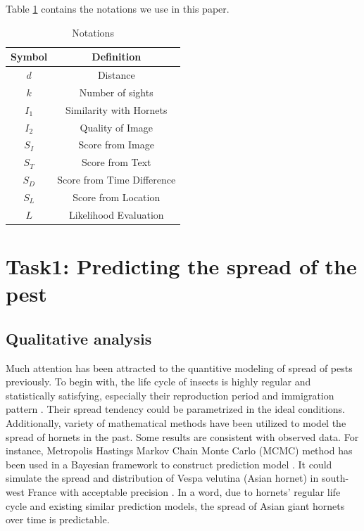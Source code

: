 \documentclass{mcmthesis}
\begin{document}
	Table \ref{tabbb1} contains the notations we use in this paper.

\linespread{1.2}		
		\begin{table}[H]
		\centering
		\caption{Notations \label{tabbb1}}
\begin{tabular}{c|c}
\hline
Symbol & Definition                 \\ \hline
$d$      & Distance                   \\
$k$      & Number of sights           \\
$I_1$     & Similarity with Hornets    \\
$I_2$     & Quality of Image           \\
$S_I$     & Score from Image           \\
$S_T$    & Score from Text            \\
$S_D$     & Score from Time Difference \\
$S_L$    & Score from Location        \\ 
$L$   & Likelihood Evaluation \\ \hline
\end{tabular}
\end{table}
\linespread{0.8}

\section{Task1: Predicting the spread of the pest}
	\subsection{Qualitative analysis}
	Much attention has been attracted to the quantitive modeling of spread of pests previously. To begin with, the life cycle of insects is highly regular and statistically satisfying, especially their reproduction period and immigration pattern \cite{reproduction}. Their spread tendency could be parametrized in the ideal conditions. Additionally, variety of mathematical methods have been utilized to model the spread of hornets in the past. Some results are consistent with observed data. For instance, Metropolis Hastings Markov Chain Monte Carlo (MCMC) method has been used in a Bayesian framework to construct prediction model \cite{Task_1_1}. It could simulate the spread and distribution of Vespa velutina (Asian hornet) in south-west France with acceptable precision \cite{Task_1_1}. In a word, due to hornets' regular life cycle and existing similar prediction models, the spread of  Asian giant hornets over time is predictable.
\end{document}
